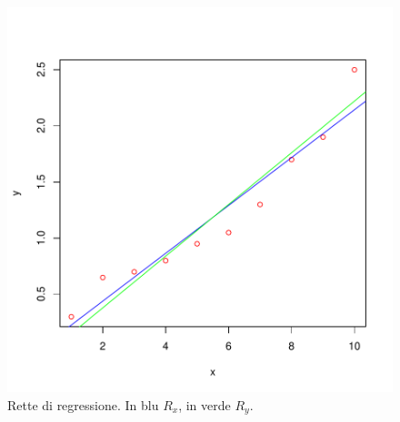 \documentclass[onecolumn,12pt]{book}
\begin{document}
\begin{figure}[htbp]
\begin{center}
\includegraphics{RbookParte2-050}
\caption{Rette di regressione. In blu $R_x$, in verde $R_y$.}
\label{fig:duerettex}
\end{center}
\end{figure}
\end{document}
